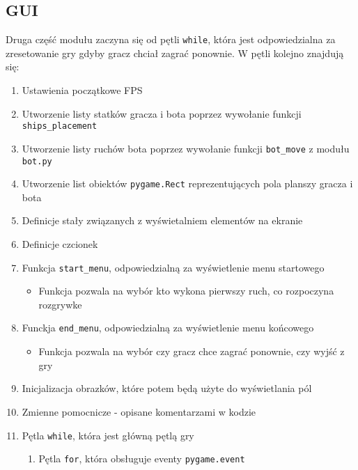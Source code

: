 \documentclass[12pt]{article}
\begin{document}
    \subsection{GUI}
    Druga część modułu zaczyna się od pętli \texttt{while}, która jest odpowiedzialna za zresetowanie
    gry gdyby gracz chciał zagrać ponownie. W pętli kolejno znajdują się:
    \begin{enumerate}
        \item Ustawienia początkowe FPS
        \item Utworzenie listy statków gracza i bota poprzez wywołanie funkcji \texttt{ships\_placement}
        \item Utworzenie listy ruchów bota poprzez wywołanie funkcji \texttt{bot\_move} z modułu \texttt{bot.py}
        \item Utworzenie list obiektów \texttt{pygame.Rect} reprezentujących pola planszy gracza i bota
        \item Definicje stały związanych z wyświetalniem elementów na ekranie
        \item Definicje czcionek
        \item Funkcja \texttt{start\_menu}, odpowiedzialną za wyświetlenie menu startowego\\
            \begin{itemize}
                \item Funkcja pozwala na wybór kto wykona pierwszy ruch, co rozpoczyna rozgrywke
            \end{itemize}
        \item Funckja \texttt{end\_menu}, odpowiedzialną za wyświetlenie menu końcowego\\
            \begin{itemize}
                \item Funkcja pozwala na wybór czy gracz chce zagrać ponownie, czy wyjść z gry
            \end{itemize}
        \item Inicjalizacja obrazków, które potem będą użyte do wyświetlania pól
        \item Zmienne pomocnicze - opisane komentarzami w kodzie
        \item Pętla \texttt{while}, która jest główną pętlą gry\\
            \begin{enumerate}
                \item Pętla \texttt{for}, która obsługuje eventy \texttt{pygame.event}\\

\end{enumerate}
\end{enumerate}
\end{document}
